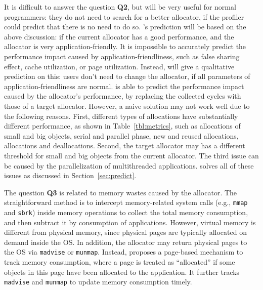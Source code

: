 
It is difficult to answer the question \textbf{Q2}, but will be very useful for normal programmers: they do not need to search for a better allocator, if the profiler could predict that there is no need to do so. \MP{}'s prediction will be based on the above discussion: if the current allocator has a good performance, and the allocator is very application-friendly. It is impossible to accurately predict the performance impact caused by application-friendliness, such as false sharing effect, cache utilization, or page utilization. Instead, \MP{} will give a qualitative prediction on this: users don't need to change the allocator, if all parameters of application-friendliness are normal. \MP{} is able to predict the performance impact caused by the allocator's performance, by replacing the collected cycles with those of a target allocator.   However, a naive solution may not work well due to the following reasons. First, different types of allocations have substantially different performance, as shown in Table~\ref{tbl:metrics}, such as allocations of small and big objects, serial and parallel phase, new and reused allocations, allocations and deallocations. Second, the target allocator may has a different threshold for small and big objects from the current allocator. The third issue can be caused by the parallelization of multithreaded applications. \MP{} solves all of these issues as discussed in Section~\ref{sec:predict}.

The question \textbf{Q3} is related to memory wastes caused by the allocator. The straightforward method is to intercept memory-related system calls (e.g., \texttt{mmap} and \texttt{sbrk}) inside memory operations to collect the total memory consumption, and then subtract it by consumption of applications. However, virtual memory is different from physical memory, since physical pages are typically allocated on demand inside the OS. In addition, the allocator may return physical pages to the OS via \texttt{madvise} or \texttt{munmap}. Instead, \MP{} proposes a page-based mechanism to track memory consumption, where a page is treated as ``allocated'' if some objects in this page have been allocated to the application. It further tracks \texttt{madvise} and \texttt{munmap} to update memory consumption timely. 

